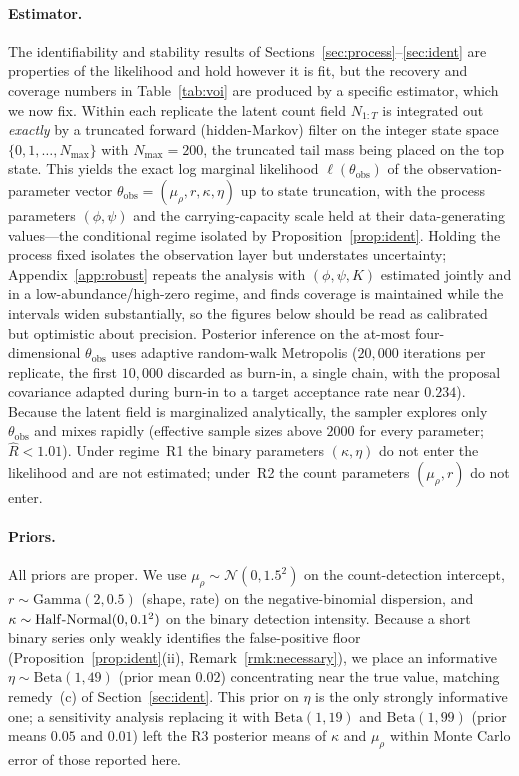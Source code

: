 \documentclass[preprint,12pt]{elsarticle}
\theoremstyle{definition}
\begin{document}
\paragraph{Estimator.}
The identifiability and stability results of
Sections~\ref{sec:process}--\ref{sec:ident} are properties of the likelihood
and hold however it is fit, but the recovery and coverage numbers in
Table~\ref{tab:voi} are produced by a specific estimator, which we now fix.
Within each replicate the latent count field $N_{1:T}$ is integrated out
\emph{exactly} by a truncated forward (hidden-Markov) filter on the integer
state space $\{0,1,\dots,N_{\max}\}$ with $N_{\max}=200$, the truncated tail
mass being placed on the top state. This yields the exact log marginal
likelihood $\ell(\theta_{\mathrm{obs}})$ of the observation-parameter vector
$\theta_{\mathrm{obs}}=(\mu_\rho,r,\kappa,\eta)$ up to state truncation, with
the process parameters $(\phi,\psi)$ and the carrying-capacity scale held at
their data-generating values---the conditional regime isolated by
Proposition~\ref{prop:ident}. Holding the process fixed isolates the observation
layer but understates uncertainty; Appendix~\ref{app:robust} repeats the analysis
with $(\phi,\psi,K)$ estimated jointly and in a low-abundance/high-zero regime,
and finds coverage is maintained while the intervals widen substantially, so the
figures below should be read as calibrated but optimistic about precision.
Posterior inference on the at-most
four-dimensional $\theta_{\mathrm{obs}}$ uses adaptive random-walk Metropolis
($20{,}000$ iterations per replicate, the first $10{,}000$ discarded as
burn-in, a single chain, with the proposal covariance adapted during burn-in
to a target acceptance rate near $0.234$). Because the latent field is
marginalized analytically, the sampler explores only $\theta_{\mathrm{obs}}$
and mixes rapidly (effective sample sizes above $2000$ for every parameter;
$\widehat R<1.01$). Under regime~R1 the binary parameters $(\kappa,\eta)$ do
not enter the likelihood and are not estimated; under~R2 the count parameters
$(\mu_\rho,r)$ do not enter.

\paragraph{Priors.}
All priors are proper. We use $\mu_\rho\sim\mathcal N(0,1.5^2)$ on the
count-detection intercept, $r\sim\mathrm{Gamma}(2,0.5)$ (shape, rate) on the
negative-binomial dispersion, and
$\kappa\sim\mathrm{Half\text-Normal}(0,0.1^2)$ on the binary detection
intensity. Because a short binary series only weakly identifies the
false-positive floor (Proposition~\ref{prop:ident}(ii),
Remark~\ref{rmk:necessary}), we place an informative
$\eta\sim\mathrm{Beta}(1,49)$ (prior mean $0.02$) concentrating near the true
value, matching remedy~(c) of Section~\ref{sec:ident}. This prior on $\eta$ is
the only strongly informative one; a sensitivity analysis replacing it with
$\mathrm{Beta}(1,19)$ and $\mathrm{Beta}(1,99)$ (prior means $0.05$ and
$0.01$) left the R3 posterior means of $\kappa$ and $\mu_\rho$ within Monte
Carlo error of those reported here.
\end{document}
